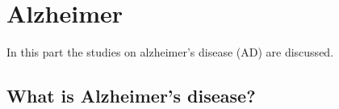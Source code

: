 \section{Alzheimer}

In this part the studies on alzheimer's disease (AD) are discussed. 

\subsection{What is Alzheimer's disease?}


